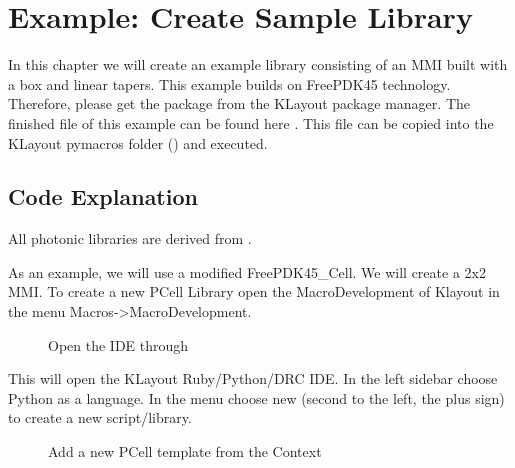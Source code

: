 \documentclass[a4paper,10pt,english]{sphinxmanual}
\begin{document}
\chapter{Example: Create Sample Library}
\label{\detokenize{photonics/example_library:example-create-sample-library}}\label{\detokenize{photonics/example_library::doc}}
In this chapter we will create an example library consisting of an MMI built with a box and linear tapers. This example builds on FreePDK45 technology. Therefore, please get the  package from the KLayout package manager. The finished file of this example can
be found here . This file can be copied into the KLayout pymacros folder () and executed.


\section{Code Explanation}
\label{\detokenize{photonics/example_library:code-explanation}}
All photonic libraries are derived from {\hyperref[\detokenize{photonics/photonics:kppc.photonics.PhotDevice}]{}}.

As an example, we will use a modified FreePDK45\_Cell. We will create a 2x2 MMI.
To create a new PCell Library open the MacroDevelopment of Klayout in the menu Macros-\textgreater{}MacroDevelopment.

\begin{figure}[htbp]
\centering
\capstart

\noindent{}
\caption{Open the IDE through }\label{\detokenize{photonics/example_library:id1}}\end{figure}

This will open the KLayout Ruby/Python/DRC IDE. In the left sidebar choose Python as a language. In the menu choose
new (second to the left, the plus sign) to create a new script/library.

\begin{figure}[htbp]
\centering
\capstart

\noindent{}
\caption{Add a new PCell template from the Context}\label{\detokenize{photonics/example_library:id2}}\end{figure}
\end{document}
